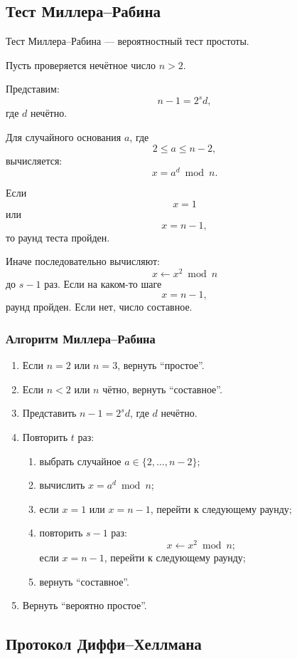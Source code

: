 \documentclass[12pt,a4paper]{article}
\begin{document}
\subsection{Тест Миллера--Рабина}

Тест Миллера--Рабина --- вероятностный тест простоты.

Пусть проверяется нечётное число $n>2$.

Представим:
\[
    n-1=2^s d,
\]
где $d$ нечётно.

Для случайного основания $a$, где
\[
    2\le a\le n-2,
\]
вычисляется:
\[
    x=a^d\bmod n.
\]

Если
\[
    x=1
\]
или
\[
    x=n-1,
\]
то раунд теста пройден.

Иначе последовательно вычисляют:
\[
    x\leftarrow x^2\bmod n
\]
до $s-1$ раз. Если на каком-то шаге
\[
    x=n-1,
\]
раунд пройден. Если нет, число составное.

\subsubsection*{Алгоритм Миллера--Рабина}

\begin{enumerate}
    \item Если $n=2$ или $n=3$, вернуть ``простое''.
    \item Если $n<2$ или $n$ чётно, вернуть ``составное''.
    \item Представить $n-1=2^s d$, где $d$ нечётно.
    \item Повторить $t$ раз:
    \begin{enumerate}
        \item выбрать случайное $a\in\{2,\ldots,n-2\}$;
        \item вычислить $x=a^d\bmod n$;
        \item если $x=1$ или $x=n-1$, перейти к следующему раунду;
        \item повторить $s-1$ раз:
        \[
            x\leftarrow x^2\bmod n;
        \]
        если $x=n-1$, перейти к следующему раунду;
        \item вернуть ``составное''.
    \end{enumerate}
    \item Вернуть ``вероятно простое''.
\end{enumerate}

\subsection{Протокол Диффи--Хеллмана}
\end{document}
